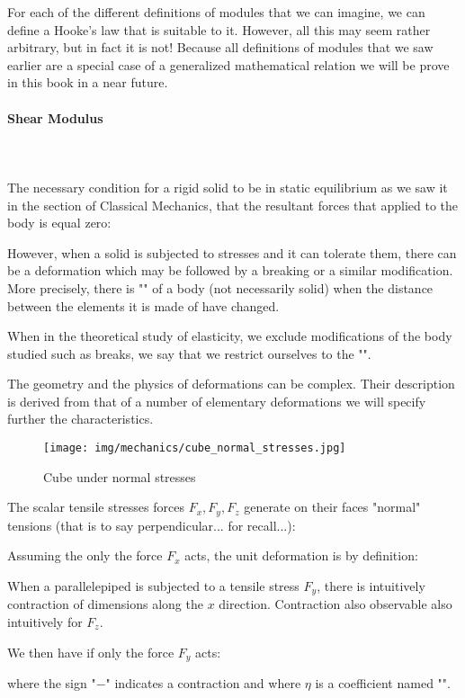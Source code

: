 	For each of the different definitions of modules that we can imagine, we can define a Hooke's law that is suitable to it. However, all this may seem rather arbitrary, but in fact it is not! Because all definitions of modules that we saw earlier are a special case of a generalized mathematical relation we will be prove in this book in a near future.
	
	\paragraph{Shear Modulus}\mbox{}\\\\
	The necessary condition for a rigid solid to be in static equilibrium as we saw it in the section of Classical Mechanics, that the resultant forces that applied to the body is equal zero:
	
	However, when a solid is subjected to stresses and it can tolerate them, there can be a deformation which may be followed by a breaking or a similar modification. More precisely, there is "" of a body (not necessarily solid) when the distance between the elements it is made of have changed.
	
	When in the theoretical study of elasticity, we exclude modifications of the body studied such as breaks, we say that we restrict ourselves to the "".

	The geometry and the physics of deformations can be complex. Their description is derived from that of a number of elementary deformations we will specify further the characteristics.
	\begin{figure}[H]
		\centering
		\texttt{[image: img/mechanics/cube\_normal\_stresses.jpg]}
		\caption{Cube under normal stresses}
	\end{figure}
	The scalar tensile stresses forces $F_x,F_y,F_z$ generate on their faces "normal" tensions (that is to say perpendicular... for recall...):
	
	Assuming the only the force $F_x$ acts, the unit deformation is by definition:
	
	When a parallelepiped is subjected to a tensile stress $F_y$, there is intuitively contraction of dimensions along the $x$ direction. Contraction also observable also intuitively for $F_z$.

	We then have if only the force $F_y$ acts:
	
	where the sign "$-$" indicates a contraction and where $\eta$ is a coefficient named "".
	
